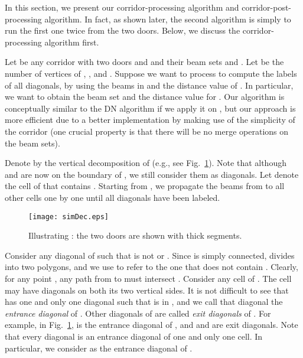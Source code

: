 \documentclass[english,runningheads,11pt]{llncs-revised}
\begin{document}
In this section, we present our corridor-processing algorithm and
corridor-post-processing algorithm. In fact, as shown later, the second algorithm is
simply to run the first one twice from the two doors. Below, we discuss the
corridor-processing algorithm first.





Let  be any corridor with two doors  and  and
their beam sets  and . Let  be the number of vertices of ,
, and .
Suppose we
want to process   to compute the labels of all diagonals,
by using the beams in  and the distance
value  of . In particular,
we want to obtain the beam set  and the distance value
 for .
Our algorithm is conceptually similar to the DN algorithm if we apply
it on , but our approach is more efficient due to a better implementation by making
use of the simplicity of the corridor (one crucial property is that there will be no merge
operations on the beam sets).



Denote by  the vertical decomposition of  (e.g.,
see Fig.~\ref{fig:simDec}). Note that although  and  are
now on the boundary of , we still consider them as diagonals.
Let  denote the cell of  that contains .
Starting from , we
propagate the beams from  to all other cells one by one until
all diagonals have been labeled.





\begin{figure}[t]
\begin{minipage}[t]{\linewidth}
\begin{center}
\texttt{[image: simDec.eps]}
\caption{\footnotesize Illustrating : the two doors are
shown with thick segments.  }
\label{fig:simDec}
\end{center}
\end{minipage}
\vspace{-0.15in}
\end{figure}

Consider any diagonal  of  such that  is not 
or . Since  is simply connected,
 divides  into two polygons, and we use  to refer
to the one that does not contain . Clearly, for any point , any path from  to  must intersect . Consider any
cell  of . The cell  may have diagonals on both its
two vertical sides. It is not difficult to see that  has one and only one diagonal 
such that  is in , and we call that diagonal the {\em
entrance diagonal} of . Other diagonals of  are called {\em
exit diagonals} of .  For example, in Fig.~\ref{fig:simDec},  is the
entrance diagonal of , and  and  are exit
diagonals. Note that every diagonal
is an entrance diagonal of one and only one cell. In particular,
we consider  as the entrance diagonal of .
\end{document}
